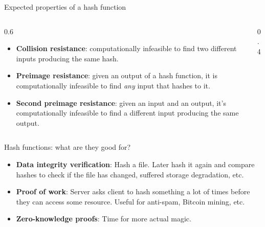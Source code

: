 \ifdefined\PRESENTATION\else\PassOptionsToClass{handout}{beamer}\fi\documentclass[aspectratio=169, lualatex]{beamer}
\begin{document}
\begin{frame}{Expected properties of a hash function}
	\begin{columns}[c]
		\begin{column}{0.6\textwidth}
			\begin{itemize}[<+->]
				\item \textbf{Collision resistance}: computationally infeasible to find
				      two different inputs producing the same hash.
				\item \textbf{Preimage resistance}: given an output of a hash function,
				      it is computationally infeasible to find \emph{any} input that hashes to it.
				\item \textbf{Second preimage resistance}: given an input and an output,
				      it's computationally infeasible to find a different input
				      producing the same output.
			\end{itemize}
		\end{column}
		\begin{column}{0.4\textwidth}
		\end{column}
	\end{columns}
\end{frame}

\begin{frame}{Hash functions: what are they good for?}
	\begin{itemize}[<+->]
		\item \textbf{Data integrity verification}: Hash a file. Later hash it
		      again and compare hashes to check if the file has changed, suffered storage
		      degradation, etc.
		\item \textbf{Proof of work}: Server asks client to hash something a lot of
		      times before they can access some resource. Useful for anti-spam, Bitcoin
		      mining, etc.
		\item \textbf{Zero-knowledge proofs}: Time for more actual magic.
	\end{itemize}
\end{frame}
\end{document}
